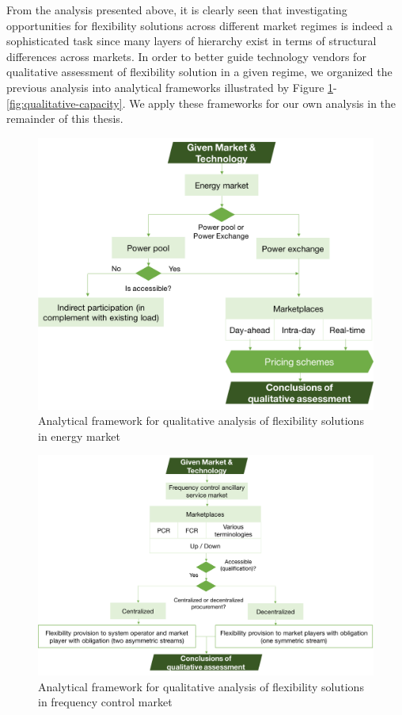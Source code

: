 From the analysis presented above, it is clearly seen that investigating opportunities for flexibility solutions across different market regimes is indeed a sophisticated task since many layers of hierarchy exist in terms of structural differences across markets. In order to better guide technology vendors for qualitative assessment of flexibility solution in a given regime, we organized the previous analysis into analytical frameworks illustrated by Figure \ref{fig:qualitative-energy}-\ref{fig:qualitative-capacity}. We apply these frameworks for our own analysis in the remainder of this thesis.

\begin{figure}[h!]
	\centering
	\includegraphics[width=0.95\linewidth]{Figures/Q_energy}
	\caption{Analytical framework for qualitative analysis of flexibility solutions in energy market}
	\label{fig:qualitative-energy}
\end{figure}

\begin{figure}[h!]
	\centering
	\includegraphics[width=0.95\linewidth]{Figures/Q_frequency_control}
	\caption{Analytical framework for qualitative analysis of flexibility solutions in frequency control market}
	\label{fig:qualitative-fr}
\end{figure}

